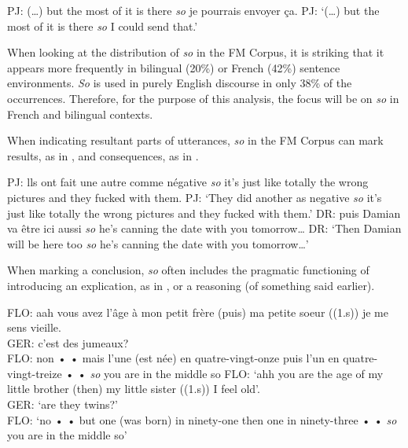 \documentclass[output=paper]{langscibook}
\begin{document}
\begin{exe}
    \ex\label{hennecke:ex:25} PJ: (…) but the most of it is there \textit{so} je pourrais envoyer ça.
    \glt PJ: ‘(…) but the most of it is there \textit{so} I could send that.’
\end{exe}

\noindent
When looking at the distribution of \textit{so} in the FM Corpus, it is striking that it appears more frequently in bilingual (20\%) or French (42\%) sentence environments. \textit{So} is used in purely English discourse in only 38\% of the occurrences. Therefore, for the purpose of this analysis, the focus will be on \textit{so} in French and bilingual contexts. 

When indicating resultant parts of utterances, \textit{so} in the FM Corpus can mark results, as in , and consequences, as in .

\begin{exe}
    \ex\label{hennecke:ex:26} PJ: lls ont fait une autre comme négative \textit{so} it’s just like totally the wrong pictures and they fucked with them.
    \glt PJ: ‘They did another as negative \textit{so} it’s just like totally the wrong pictures and they fucked with them.’
    \ex\label{hennecke:ex:27} DR: puis Damian va être ici aussi \textit{so} he’s canning the date with you tomorrow…
    \glt DR: ‘Then Damian will be here too \textit{so} he’s canning the date with you tomorrow…’
\end{exe}

\noindent
When marking a conclusion, \textit{so} often includes the pragmatic functioning of introducing an explication, as in , or a reasoning (of something said earlier).

\begin{exe}
    \ex\label{hennecke:ex:28} FLO: aah vous avez l’âge à mon petit frère (puis) ma petite soeur ((1.s)) je me sens vieille. \\
    GER: c’est des jumeaux? \\
    FLO: non • • mais l’une (est née) en quatre-vingt-onze puis l’un en quatre-vingt-treize • • \textit{so} you are in the middle so
    \glt FLO: ‘ahh you are the age of my little brother (then) my little sister ((1.s)) I feel old’. \\
    GER: ‘are they twins?’ \\
    FLO: ‘no • •  but one (was born) in ninety-one then one in ninety-three • •  \textit{so} you are in the middle so’
\end{exe}
\end{document}
